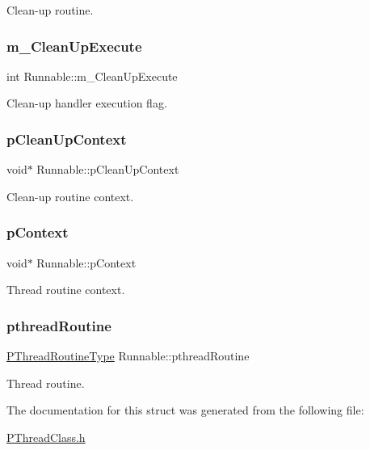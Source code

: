Clean-\/up routine. 

\mbox{\label{structRunnable_aee103a0bc58c7dc4a92da67eac8436fc}} 
\subsubsection{\texorpdfstring{m\+\_\+\+Clean\+Up\+Execute}{m\_CleanUpExecute}}
{\footnotesize\ttfamily int Runnable\+::m\+\_\+\+Clean\+Up\+Execute}



Clean-\/up handler execution flag. 

\mbox{\label{structRunnable_a30fc8274b7103f58fbbd56aa165692b4}} 
\subsubsection{\texorpdfstring{p\+Clean\+Up\+Context}{pCleanUpContext}}
{\footnotesize\ttfamily void$\ast$ Runnable\+::p\+Clean\+Up\+Context}



Clean-\/up routine context. 

\mbox{\label{structRunnable_a5b950239feca1d3033297fae933209e9}} 
\subsubsection{\texorpdfstring{p\+Context}{pContext}}
{\footnotesize\ttfamily void$\ast$ Runnable\+::p\+Context}



Thread routine context. 

\mbox{\label{structRunnable_ad850dfe862b73a3e9f59c5fe383bd20d}} 
\subsubsection{\texorpdfstring{pthread\+Routine}{pthreadRoutine}}
{\footnotesize\ttfamily \hyperlink{group__FUNC__DEFS_gaeef66643e734485d781ca826339879ea}{P\+Thread\+Routine\+Type} Runnable\+::pthread\+Routine}



Thread routine. 



The documentation for this struct was generated from the following file\+:\begin{DoxyCompactItemize}
\item 
\hyperlink{PThreadClass_8h}{P\+Thread\+Class.\+h}\end{DoxyCompactItemize}
